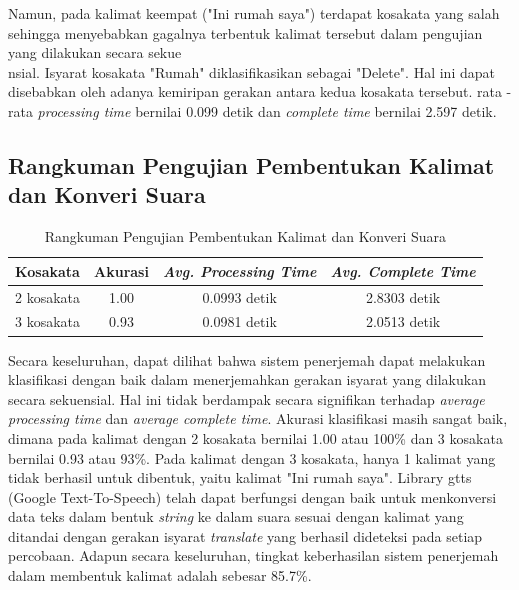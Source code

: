 Namun, pada kalimat keempat ("Ini rumah saya") terdapat kosakata yang salah sehingga menyebabkan gagalnya terbentuk kalimat tersebut dalam pengujian yang dilakukan secara sekue\\nsial. Isyarat kosakata "Rumah" diklasifikasikan sebagai "Delete". Hal ini dapat disebabkan oleh adanya kemiripan gerakan antara kedua kosakata tersebut. rata - rata \emph{processing time} bernilai 0.099 detik dan \emph{complete time} bernilai 2.597 detik.

\subsection{Rangkuman Pengujian Pembentukan Kalimat dan Konveri Suara}
\label{sec:analisikalimatsuara}

\begin{longtable}{|c|c|c|c|}
  \caption{Rangkuman Pengujian Pembentukan Kalimat dan Konveri Suara}
  \label{tb:evaluasiKalimatdanSuara}                                   \\
  \hline
  \rowcolor[HTML]{C0C0C0}
  \textbf{Kosakata} & \textbf{Akurasi} & \emph{\textbf{Avg. Processing Time}} & \emph{\textbf{Avg. Complete Time}} \\
  \hline
  2 kosakata & 1.00 & 0.0993 detik & 2.8303 detik \\
  3 kosakata & 0.93 & 0.0981 detik & 2.0513 detik \\
  \hline
\end{longtable}

Secara keseluruhan, dapat dilihat bahwa sistem penerjemah dapat melakukan klasifikasi dengan baik dalam menerjemahkan gerakan isyarat yang dilakukan secara sekuensial. Hal ini tidak berdampak secara signifikan terhadap \emph{average processing time} dan \emph{average complete time}. Akurasi klasifikasi masih sangat baik, dimana pada kalimat dengan 2 kosakata bernilai 1.00 atau 100\% dan 3 kosakata bernilai 0.93 atau 93\%. Pada kalimat dengan 3 kosakata, hanya 1 kalimat yang tidak berhasil untuk dibentuk, yaitu kalimat "Ini rumah saya". Library gtts (Google Text-To-Speech) telah dapat berfungsi dengan baik untuk menkonversi data teks dalam bentuk \emph{string} ke dalam suara sesuai dengan kalimat yang ditandai dengan gerakan isyarat \emph{translate} yang berhasil dideteksi pada setiap percobaan. Adapun secara keseluruhan, tingkat keberhasilan sistem penerjemah dalam membentuk kalimat adalah sebesar 85.7\%.

